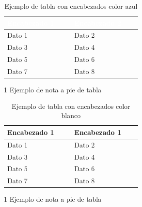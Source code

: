 \newpage
\begin{multicols}{2}

\begin{table}[H]
\caption{Ejemplo de tabla con encabezados color azul}
\label{tab:ejemplo_tabla_azul}
\begin{threeparttable}
{\small{}
\begin{tabular}{M{0.4\linewidth}M{0.4\linewidth}}\hline
    
    \sffamily\bfseries{}\textcolor{White}{Encabezado 1} & \sffamily\bfseries{}\textcolor{White}{Encabezado 2} \\ \hline
    
    Dato 1 & Dato 2 \\
    Dato 3 & Dato 4 \\
    Dato 5 & Dato 6 \\
    Dato 7 & Dato 8 \\

    \hline
\end{tabular}}
    \begin{tablenotes}\tiny %
        \item[1] Ejemplo de nota a pie de tabla
    \end{tablenotes}
\end{threeparttable}
\end{table}



\begin{table}[H]

\caption{Ejemplo de tabla con encabezados color blanco}
\label{tab:ejemplo_tabla_blanco}
\begin{threeparttable}
{\small{}
\begin{tabular}{M{0.4\linewidth}M{0.4\linewidth}}\hline
    
    \sffamily\bfseries{}\textcolor{Primario}{Encabezado 1} & \sffamily\bfseries{}\textcolor{Primario}{Encabezado 1} \\ \hline
    
    Dato 1 & Dato 2 \\
    Dato 3 & Dato 4 \\
    Dato 5 & Dato 6 \\
    Dato 7 & Dato 8 \\

    \hline
\end{tabular}}
    \begin{tablenotes}\tiny %
        \item[1] Ejemplo de nota a pie de tabla
    \end{tablenotes}
\end{threeparttable}
\end{table}


\end{multicols}
